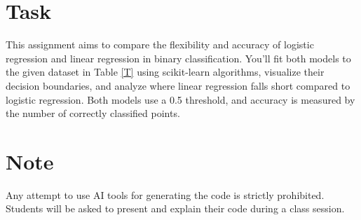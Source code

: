 \documentclass{article}
\begin{document}
	\section*{Task}
	This assignment aims to compare the flexibility and accuracy of logistic regression and linear regression in binary classification. You'll fit both models to the given dataset in Table \ref{T} using scikit-learn algorithms, visualize their decision boundaries, and analyze where linear regression falls short compared to logistic regression. Both models use a 0.5 threshold, and accuracy is measured by the number of correctly classified points.
	\section*{Note}
	Any attempt to use AI tools for generating the code is strictly prohibited. Students will be asked to present and explain their code during a class session.
\end{document}
